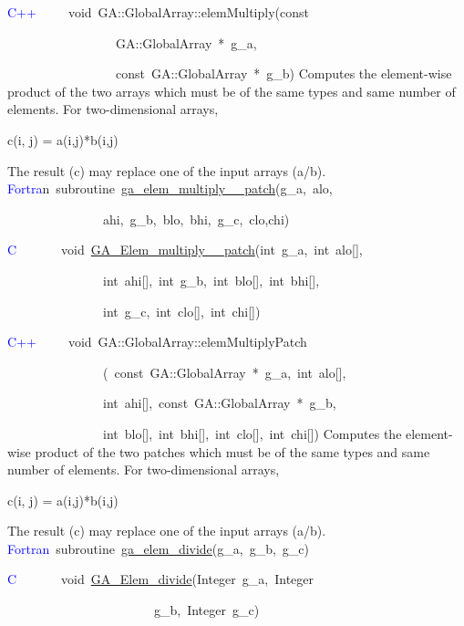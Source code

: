 \textcolor{blue}{C++}~~~~~void~GA::GlobalArray::elemMultiply(const~

~~~~~~~~~~~~~~~~~GA::GlobalArray~{*}~g\_a,~

~~~~~~~~~~~~~~~~~const~GA::GlobalArray~{*}~g\_b)
Computes the element-wise product of the two arrays which must be
of the same types and same number of elements. For two-dimensional
arrays,

c(i, j) = a(i,j){*}b(i,j)

The result (c) may replace one of the input arrays (a/b). 
\textcolor{blue}{Fortra}n~subroutine~\href{http://www.emsl.pnl.gov/docs/global/ga_ops.html\#ga_elem_multiply_patch}{ga\_{}elem\_{}multiply\_{}\_{}patch}(g\_a,~alo,~

~~~~~~~~~~~~~~~ahi,~g\_b,~blo,~bhi,~g\_c,~clo,chi)~

\textcolor{blue}{C}~~~~~~~void~\href{http://www.emsl.pnl.gov/docs/global/c_nga_ops.html\#ga_elem_multiply_patch}{GA\_{}Elem\_{}multiply\_{}\_{}patch}(int~g\_a,~int~alo{[}{]},~

~~~~~~~~~~~~~~~int~ahi{[}{]},~int~g\_b,~int~blo{[}{]},~int~bhi{[}{]},

~~~~~~~~~~~~~~~int~g\_c,~int~clo{[}{]},~int~chi{[}{]})~

\textcolor{blue}{C++~}~~~~void~GA::GlobalArray::elemMultiplyPatch

~~~~~~~~~~~~~~~(~const~GA::GlobalArray~{*}~g\_a,~int~alo{[}{]},~

~~~~~~~~~~~~~~~int~ahi{[}{]},~const~GA::GlobalArray~{*}~g\_b,~

~~~~~~~~~~~~~~~int~blo{[}{]},~int~bhi{[}{]},~int~clo{[}{]},~int~chi{[}{]})
Computes the element-wise product of the two patches which must be
of the same types and same number of elements. For two-dimensional
arrays,

c(i, j) = a(i,j){*}b(i,j)

The result (c) may replace one of the input arrays (a/b).
\textcolor{blue}{Fortran}~subroutine~\href{http://www.emsl.pnl.gov/docs/global/ga_ops.html\#ga_elem_divide}{ga\_{}elem\_{}divide}(g\_a,~g\_b,~g\_c)~

\textcolor{blue}{C}~~~~~~~void~\href{http://www.emsl.pnl.gov/docs/global/c_nga_ops.html\#ga_elem_divide}{GA\_{}Elem\_{}divide}(Integer~g\_a,~Integer~

~~~~~~~~~~~~~~~~~~~~~~~g\_b,~Integer~g\_c)

